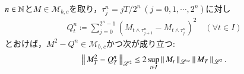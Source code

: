 	\begin{screen}
		\begin{lem}[二次変分補題]
			$n \in \mathbb{N}$と$M \in \mathcal{M}_{b,c}$を取り，$\tau_j^n = jT/2^n\ (j=0,1,\cdots,2^n)$に対し
			\begin{align}
				Q_t^n \coloneqq \sum_{j=0}^{2^n-1} \left( M_{t \wedge \tau_{j+1}^n} - M_{t \wedge \tau_j^n} \right)^2 \quad (\forall t \in I)
				\label{eq:lem_quadratic_variation_0}
			\end{align}
			とおけば，$M^2 - Q^n \in \mathcal{M}_{b,c}$かつ次が成り立つ:
			\begin{align}
				\left\|\, M_T^2 - Q_T^n\, \right\|_{\mathscr{L}^2} \leq 2 \operatorname*{sup}_{t \in I} \left\|\, M_t\, \right\|_{\mathscr{L}^\infty} \left\|\, M_T\, \right\|_{\mathscr{L}^2}.
			\end{align}
			\label{lem:quadratic_variation}
		\end{lem}
	\end{screen}
	
